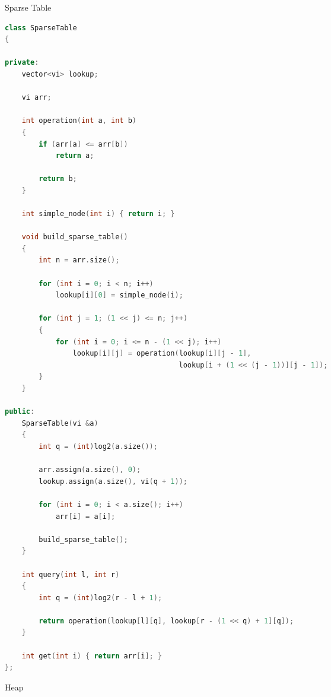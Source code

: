 \documentclass[leter]{amsart}
\begin{document}
Sparse Table
\begin{multicols}{2}
\begin{lstlisting}[language=C++]
class SparseTable
{

private:
    vector<vi> lookup;

    vi arr;

    int operation(int a, int b)
    {
        if (arr[a] <= arr[b])
            return a;

        return b;
    }

    int simple_node(int i) { return i; }

    void build_sparse_table()
    {
        int n = arr.size();

        for (int i = 0; i < n; i++)
            lookup[i][0] = simple_node(i);

        for (int j = 1; (1 << j) <= n; j++)
        {
            for (int i = 0; i <= n - (1 << j); i++)
                lookup[i][j] = operation(lookup[i][j - 1],
                                         lookup[i + (1 << (j - 1))][j - 1]);
        }
    }

public:
    SparseTable(vi &a)
    {
        int q = (int)log2(a.size());

        arr.assign(a.size(), 0);
        lookup.assign(a.size(), vi(q + 1));

        for (int i = 0; i < a.size(); i++)
            arr[i] = a[i];

        build_sparse_table();
    }

    int query(int l, int r)
    {
        int q = (int)log2(r - l + 1);

        return operation(lookup[l][q], lookup[r - (1 << q) + 1][q]);
    }

    int get(int i) { return arr[i]; }
};

\end{lstlisting}
\end{multicols}
Heap
\end{document}
